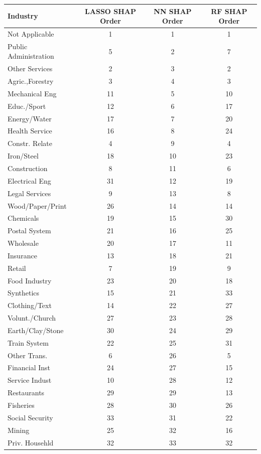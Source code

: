 \begin{tabular}{lccc}
\hline\hline
Industry & LASSO SHAP Order & NN SHAP Order & RF SHAP Order \\
\hline
Not Applicable&1&1&1\\
Public Administration&5&2&7\\
Other Services&2&3&2\\
Agric.,Forestry&3&4&3\\
Mechanical Eng&11&5&10\\
Educ./Sport&12&6&17\\
Energy/Water&17&7&20\\
Health Service&16&8&24\\
Constr. Relate&4&9&4\\
Iron/Steel&18&10&23\\
Construction&8&11&6\\
Electrical Eng&31&12&19\\
Legal Services&9&13&8\\
Wood/Paper/Print&26&14&14\\
Chemicals&19&15&30\\
Postal System&21&16&25\\
Wholesale&20&17&11\\
Insurance&13&18&21\\
Retail&7&19&9\\
Food Industry&23&20&18\\
Synthetics&15&21&33\\
Clothing/Text&14&22&27\\
Volunt./Church&27&23&28\\
Earth/Clay/Stone&30&24&29\\
Train System&22&25&31\\
Other Trans.&6&26&5\\
Financial Inst&24&27&15\\
Service Indust&10&28&12\\
Restaurants&29&29&13\\
Fisheries&28&30&26\\
Social Security&33&31&22\\
Mining&25&32&16\\
Priv. Househld&32&33&32\\
\hline\hline
\end{tabular}
